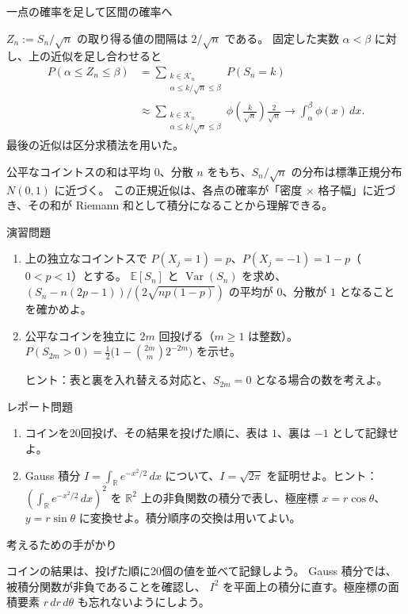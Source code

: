 \documentclass[a4paper,10pt,pdflatex,ja=standard,jafont=ipaex-type1,
  magstyle=real,scale=1]{bxjsarticle}
\newcommand{\topic}[1]{\par\vspace{5pt}
  {\large\sffamily\mdseries\color{accent}#1}\par\vspace{2pt}}
\newcommand{\R}{\mathbb R}
\newcommand{\E}{\mathbb E}
\newcommand{\Var}{\operatorname{Var}}
\begin{document}
\topic{一点の確率を足して区間の確率へ}
$Z_n:=S_n/\sqrt n$ の取り得る値の間隔は $2/\sqrt n$ である。
固定した実数 $\alpha<\beta$ に対し、上の近似を足し合わせると
$$\begin{aligned}
 P(\alpha\le Z_n\le\beta)
 &=\sum_{\substack{k\in\mathcal K_n\\\alpha\le k/\sqrt n\le\beta}}P(S_n=k)\\
 &\approx\sum_{\substack{k\in\mathcal K_n\\\alpha\le k/\sqrt n\le\beta}}
 \phi\left(\frac{k}{\sqrt n}\right)\frac{2}{\sqrt n}
 \longrightarrow\int_\alpha^\beta\phi(x)\,dx.
\end{aligned}$$
最後の近似は区分求積法を用いた。
\par\smallskip
公平なコイントスの和は平均 $0$、分散 $n$ をもち、$S_n/\sqrt n$ の分布は標準正規分布 $N(0,1)$ に近づく。
この正規近似は、各点の確率が「密度 $\times$ 格子幅」に近づき、その和が Riemann 和として積分になることから理解できる。

\newpage
\topic{演習問題}
\begin{enumerate}[label=\arabic*.]
  \item 上の独立なコイントスで $P(X_j=1)=p$、$P(X_j=-1)=1-p$（$0<p<1$）とする。
  $\E[S_n]$ と $\Var(S_n)$ を求め、
  $(S_n-n(2p-1))/(2\sqrt{np(1-p)})$ の平均が $0$、分散が $1$ となることを確かめよ。
  \item 公平なコインを独立に $2m$ 回投げる（$m\ge1$ は整数）。
  $P(S_{2m}>0)=\frac12\bigl(1-\binom{2m}{m}2^{-2m}\bigr)$ を示せ。
  \par ヒント：表と裏を入れ替える対応と、$S_{2m}=0$ となる場合の数を考えよ。
\end{enumerate}

\topic{レポート問題}
\begin{enumerate}[label=\arabic*.]
  \item コインを20回投げ、その結果を投げた順に、表は $1$、裏は $-1$ として記録せよ。
  \item Gauss 積分 $I=\int_\R e^{-x^2/2}\,dx$ について、$I=\sqrt{2\pi}$ を証明せよ。ヒント：$(\int_\R e^{-x^2/2}\,dx)^2$ を $\R^2$ 上の非負関数の積分で表し、極座標
  $x=r\cos\theta$、$y=r\sin\theta$ に変換せよ。積分順序の交換は用いてよい。
\end{enumerate}

\topic{考えるための手がかり}
コインの結果は、投げた順に20個の値を並べて記録しよう。
Gauss 積分では、被積分関数が非負であることを確認し、
$I^2$ を平面上の積分に直す。極座標の面積要素 $r\,dr\,d\theta$ も忘れないようにしよう。
\vfill
\end{document}
